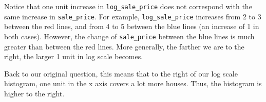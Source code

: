 \documentclass{article}\usepackage[]{graphicx}\usepackage[]{color}
\newenvironment{knitrout}{}{} %
\begin{document}
\begin{knitrout}
{}



\end{knitrout}

Notice that one unit increase in \verb`log_sale_price` does not correspond with the same increase in \verb`sale_price`. For example, \verb`log_sale_price` increases from 2 to 3 between the red lines, and from 4 to 5 between the blue lines (an increase of 1 in both cases). However, the change of \verb`sale_price` between the blue lines is much greater than between the red lines. More generally, the farther we are to the right, the larger 1 unit in log scale becomes.

Back to our original question, this means that to the right of our log scale histogram, one unit in the x axis covers a lot more houses. Thus, the histogram is higher to the right.
\end{document}
